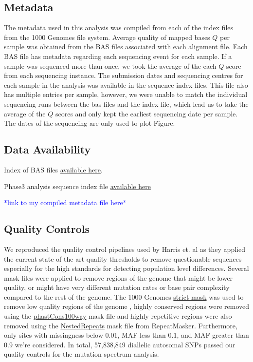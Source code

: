 \documentclass[9pt,lineno]{elife}
\newcommand{\todo}[1]{\textcolor{blue}{*#1*}}
\begin{document}
\subsection{Metadata}
The metadata used in this analysis was compiled from each of the index files from the 1000 Genomes file system. 
Average quality of mapped bases $Q$ per sample was obtained from the BAS files associated with each alignment file. 
Each BAS file has metadata regarding each sequencing event for each sample. 
If a sample was sequenced more than once, we took the average of the each $Q$ score from each sequencing instance. 
The submission dates and sequencing centres for each sample in the analysis was available in the sequence index files.  
This file also has multiple entries per sample, however, we were unable to match the individual sequencing runs between the bas files and the index file, which lead us to take the average of the $Q$ scores and only kept the earliest sequencing date per sample. 
The dates of the sequencing are only used to plot Figure.

\subsection{Data Availability}

Index of BAS files \href{http://ftp.1000genomes.ebi.ac.uk/vol1/ftp/data_collections/1000_genomes_project/1000genomes.low_coverage.GRCh38DH.alignment.index}{available here}.

Phase3 analysis sequence index file  \href{http://ftp.1000genomes.ebi.ac.uk/vol1/ftp/phase3/20130502.phase3.analysis.sequence.index}{available here} 

\todo{link to my compiled metadata file here}

\subsection{Quality Controls}
We reproduced the quality control pipelines used by Harris et. al as they applied the current state of the art quality thresholds to remove questionable sequences especially for the high standards for detecting population level differences. 
Several mask files were applied to remove regions of the genome that might be lower quality, or might have very different mutation rates or base pair complexity compared to the rest of the genome. 
The  1000 Genomes \href{http://ftp.1000genomes.ebi.ac.uk/vol1/ftp/release/20130502/supporting/accessible_genome_masks/20141020.strict_mask.whole_genome.bed}{strict mask} was used to remove low quality regions of the genome , highly conserved regions were removed using the \href{http://hgdownload.cse.ucsc.edu/goldenPath/hg19/database/phastConsElements100way.txt.gz}{phastCons100way} mask file and highly repetitive regions were also removed using the \href{http://hgdownload.cse.ucsc.edu/goldenpath/hg19/database/nestedRepeats.txt.gz}{NestedRepeats} mask file from RepeatMasker. 
Furthermore, only sites with missingness below 0.01, MAF less than 0.1, and MAF greater than 0.9 we're considered.
In total, 57,838,849 diallelic autosomal SNPs passed our quality controls for the mutation spectrum analysis.
\end{document}
